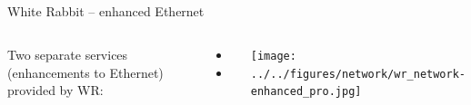 \documentclass[compress,red]{beamer}
\begin{document}
\subsection{}
\begin{frame}{White Rabbit -- enhanced Ethernet}


\begin{columns}[c]
 
  Two separate services (enhancements to Ethernet) provided by WR: 
  \begin{itemize}
    \item \color{blue!90}{Synchronization: \\
accuracy better than 1 ns \\
precision  (tens of ps sdev skew max)}
    \item \color{red}{Deterministic, reliable and low-latency Control Data delivery}
  \end{itemize}

    \begin{center}
    \texttt{[image: ../../figures/network/wr\_network-enhanced\_pro.jpg]}
    \end{center}
\end{columns}

\end{frame}
\end{document}
